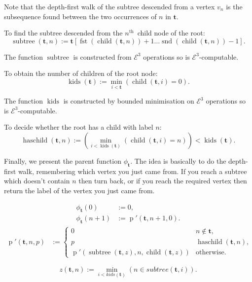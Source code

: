 \documentclass[a4paper]{article}
\newcommand{\grz}[1]{$\mathcal{E}^{#1}$}	%
\newcommand{\nth}{$n^{\textrm{th}}$~}	%
\newcommand{\tvec}{\mathbf{t}}	%
\newcommand{\recur}[1]{\begin{equation} \begin{split} #1 \end{split} \end{equation}}	%
\newcommand{\recurN}[1]{\begin{equation*} \begin{split} #1 \end{split} \end{equation*}}	%
\theoremstyle{plain}
\theoremstyle{definition}
\begin{document}
Note that the depth-first walk of the subtree descended from a vertex $v_n$ is the subsequence found between the two occurrences of $n$ in $\tvec$. 

To find the subtree descended from the \nth child node of the root:
\begin{equation} \operatorname{subtree}(\tvec,n) := \tvec[\operatorname{fst}(\operatorname{child}(\tvec,n))+1 \dots \operatorname{snd}(\operatorname{child}(\tvec,n))-1]. \end{equation}

The function $\operatorname{subtree}$ is constructed from \grz{3} operations so is \grz{3}-computable.

To obtain the number of children of the root node:
\begin{equation} \operatorname{kids}(\tvec) := \min_{i < \tvec} (\operatorname{child}(\tvec,i)=0). \end{equation}

The function $\operatorname{kids}$ is constructed by bounded minimisation on \grz{3} operations so is \grz{3}-computable.

To decide whether the root has a child with label $n$:
\begin{equation} \operatorname{haschild}(\tvec,n) :=  \left( \min_{i < \operatorname{kids}(\tvec)}({\operatorname{child}(\tvec,i)=n}) \right) < \operatorname{kids}(\tvec). \end{equation}


Finally, we present the parent function $\phi_{\tvec}$. The idea is basically to do the depth-first walk, remembering which vertex you just came from. If you reach a subtree which doesn't contain $n$ then turn back, or if you reach the required vertex then return the label of the vertex you just came from.

\recur{
\phi_{\tvec}(0) &:= 0, \\
\phi_{\tvec}(n+1) &:= \operatorname{p}'(\tvec,n+1,0).
}
\recurN{
\operatorname{p}'(\tvec,n,p) &:= \begin{cases}
						0 & n \not \in \tvec, \\
						p & \operatorname{haschild}(\tvec,n), \\
						\operatorname{p}'(\operatorname{subtree}(\tvec,z),n,\operatorname{child}(\tvec,z)) & \textrm{otherwise.}
					\end{cases}
}

\begin{equation*} z(\tvec,n) := \min_{i < kids(\tvec)}(n \in subtree(\tvec,i)). \end{equation*}
\end{document}
